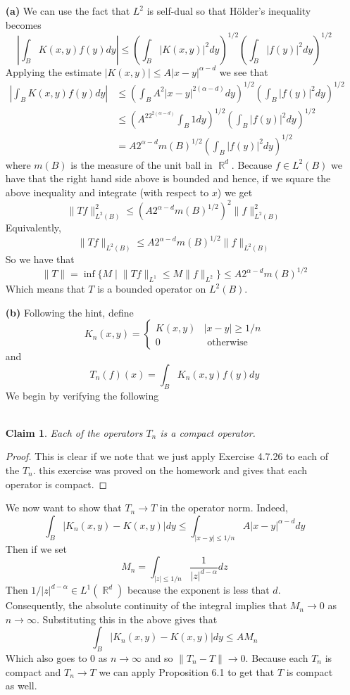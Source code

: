 \documentclass{article}
\DeclareMathOperator{\R}{\mathbb{R}}
\DeclareMathOperator{\suchthat}{\mathrel{|}}
\newcommand{\exercise}[1]{\noindent{\textbf{Exercise #1:}}}
\newcommand{\norm}[1]{\|#1\|}
\newtheorem*{claim}{\\ Claim}
\begin{document}
\exercise{4.7.28}
\begin{enumerate}
\item [\textbf{(a)}] We can use the fact that $L^2$ is self-dual so
  that H\"{o}lder's inequality becomes
  \[
  \left|\int_B K(x,y)f(y)dy\right| \leq \left(\int_B
      |K(x,y)|^2dy\right)^{1/2}\left(\int_B |f(y)|^2dy\right)^{1/2}
  \]
  Applying the estimate $|K(x,y)| \leq A|x-y|^{\alpha - d}$ we see that
  \begin{align*}
    \left|\int_B K(x,y)f(y)dy\right| &\leq \left(\int_B
      A^2|x-y|^{2(\alpha - d)}dy\right)^{1/2}\left(\int_B
      |f(y)|^2dy\right)^{1/2} \\
    &\leq \left(A^22^{2(\alpha - d)}\int_B
      1 dy\right)^{1/2}\left(\int_B |f(y)|^2dy\right)^{1/2} \\
    &= A2^{\alpha - d}m(B)^{1/2}\left(\int_B |f(y)|^2dy\right)^{1/2}
  \end{align*}
  where $m(B)$ is the measure of the unit ball in $\R^d$. Because $f
  \in L^2(B)$ we have that the right hand side above is bounded and
  hence, if we square the above inequality and integrate (with respect
  to $x$) we get
  \[
  \norm{Tf}_{L^2(B)}^2 \leq (A2^{\alpha - d}m(B)^{1/2})^2\norm{f}_{L^2(B)}^2
  \]
  Equivalently,
  \[
  \norm{Tf}_{L^2(B)} \leq A2^{\alpha - d}m(B)^{1/2}\norm{f}_{L^2(B)}
  \]
  So we have that
  \[
  \norm{T} = \inf \{M \suchthat \norm{Tf}_{L^1} \leq M\norm{f}_{L^2}\}
  \leq A2^{\alpha - d}m(B)^{1/2}
  \]
  Which means that $T$ is a bounded operator on $L^2(B)$.
\item [\textbf{(b)}] Following the hint, define
\[
K_n(x,y) =
\begin{cases}
  K(x,y) & |x-y| \geq 1/n \\
  0      & \text{ otherwise}
\end{cases}
\]
and
\[
T_n(f)(x) = \int_B K_n(x,y)f(y)dy
\]
We begin by verifying the following
\begin{claim}
  Each of the operators $T_n$ is a compact operator.
\end{claim}
\begin{proof}
  This is clear if we note that we just apply Exercise 4.7.26 to each
  of the $T_n$. this exercise was proved on the homework and gives
  that each operator is compact.
\end{proof}
We now want to show that $T_n \to T$ in the operator norm. Indeed,
\[
\int_B|K_n(x,y) - K(x,y)|dy \leq \int_{|x-y| \leq 1/n} A|x-y|^{\alpha - d}dy
\]
Then if we set
\[
M_n = \int_{|z| \leq 1/n} \frac{1}{|z|^{d-\alpha}}dz
\]
Then $1/|z|^{d - \alpha} \in L^1(\R^d)$ because the exponent is less
that $d$. Consequently, the absolute continuity of the integral
implies that $M_n \to 0$ as $n\to \infty$. Substituting this in the
above gives that
\[
\int_B|K_n(x,y) - K(x,y)|dy \leq AM_n
\]
Which also goes to $0$ as $n\to \infty$ and so $\norm{T_n - T} \to
0$. Because each $T_n$ is compact and $T_n \to T$ we can apply
Proposition 6.1 to get that $T$ is compact as well.
\end{enumerate}
\end{document}
